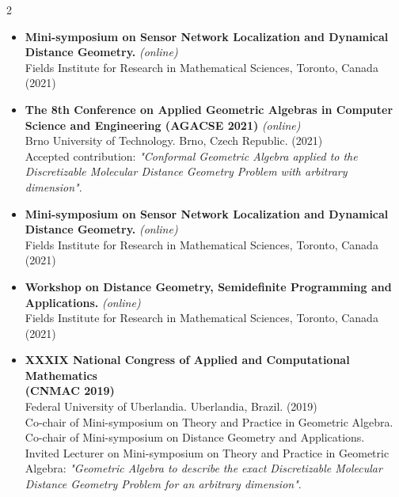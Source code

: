 \documentclass[10pt,A4,english]{article}
\begin{document}
\begin{paracol}{2}
\begin{rightcolumn}
\begin{itemize}[leftmargin=*]
\bigskip 

\item \textbf{Mini-symposium on Sensor Network Localization and Dynamical Distance Geometry.} \textit{(online)} 
\medskip \\ 
Fields Institute for Research in Mathematical Sciences, Toronto, Canada (2021)

\bigskip 

\item \textbf{The 8th Conference on Applied Geometric Algebras in Computer Science and Engineering (AGACSE 2021)} \textit{(online)} 
\medskip \\
Brno University of Technology. Brno, Czech Republic. (2021)
\medskip \\
Accepted contribution: \textit{"Conformal Geometric Algebra applied to the Discretizable Molecular Distance Geometry Problem with arbitrary dimension"}.

\bigskip 

\item \textbf{Mini-symposium on Sensor Network Localization and Dynamical \\ Distance Geometry.} \textit{(online)}
\medskip \\ 
Fields Institute for Research in Mathematical Sciences, Toronto, Canada (2021)

\bigskip 

\item \textbf{Workshop on Distance Geometry, Semidefinite Programming and \\ Applications.} \textit{(online)} 
\medskip \\ 
Fields Institute for Research in Mathematical Sciences, Toronto, Canada (2021)

\bigskip 

\item \textbf{XXXIX National Congress of Applied and Computational Mathematics \\ (CNMAC 2019)} 
\medskip \\ 
Federal University of Uberlandia. Uberlandia, Brazil. (2019)
\medskip \\ 
Co-chair of Mini-symposium on Theory and Practice in Geometric Algebra.
\medskip \\ 
Co-chair of Mini-symposium on Distance Geometry and Applications.
\medskip \\
Invited Lecturer on Mini-symposium on Theory and Practice in Geometric Algebra: \textit{"Geometric Algebra to describe the exact Discretizable Molecular Distance Geometry Problem for an arbitrary dimension"}.


\end{itemize}
\end{rightcolumn}
\end{paracol}
\end{document}
